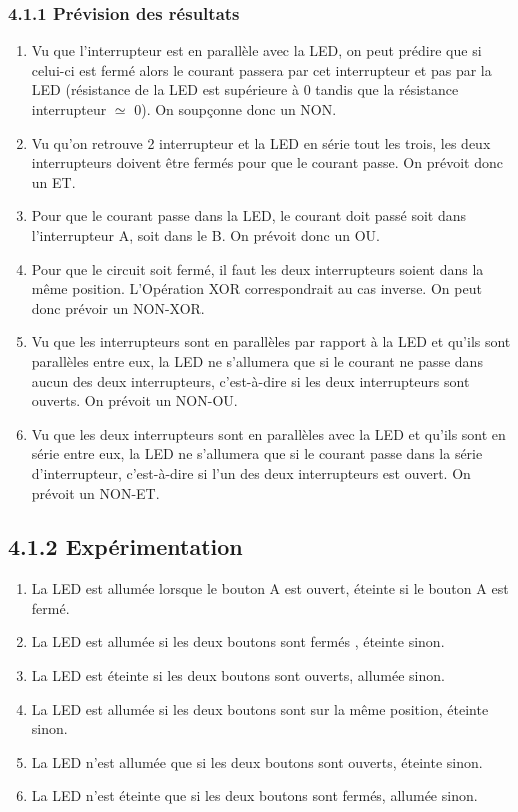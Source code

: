 \documentclass{report}
\begin{document}
\subsubsection*{4.1.1 Pr\'evision des r\'esultats}
\begin{enumerate}
\item Vu que l'interrupteur est en parall\`ele avec la LED, on peut pr\'edire que si celui-ci est ferm\'e alors le courant passera par cet interrupteur et pas par la LED (r\'esistance de la LED est sup\'erieure \`a 0 tandis que la r\'esistance interrupteur $\simeq$ 0). On soup\c conne donc un NON.
\item Vu qu'on retrouve 2 interrupteur et la LED en s\'erie tout les trois, les deux interrupteurs doivent \^etre ferm\'es pour que le courant passe. On pr\'evoit donc un ET.
\item Pour que le courant passe dans la LED, le courant doit pass\'e soit dans l'interrupteur A, soit dans le B. On pr\'evoit donc un OU.
\item Pour que le circuit soit ferm\'e, il faut les deux interrupteurs soient dans la m\^eme position. L'Op\'eration XOR correspondrait au cas inverse. On peut donc pr\'evoir un NON-XOR.
\item Vu que les interrupteurs sont en parall\`eles par rapport \`a la LED et qu'ils sont parall\`eles entre eux, la LED ne s'allumera que si le courant ne passe dans aucun des deux interrupteurs, c'est-\`a-dire si les deux interrupteurs sont ouverts. On pr\'evoit un NON-OU.
\item Vu que les deux interrupteurs sont en parallèles avec la LED et qu'ils sont en s\'erie entre eux, la LED ne s'allumera que si le courant passe dans la s\'erie d'interrupteur, c'est-\`a-dire si l'un des deux interrupteurs est ouvert. On pr\'evoit un NON-ET.
\end{enumerate}
\subsection*{4.1.2 Exp\'erimentation}
\begin{enumerate}
\item La LED est allum\'ee lorsque le bouton A est ouvert, \'eteinte si le bouton A est ferm\'e.
\item La LED est allum\'ee si les deux boutons sont ferm\'es , \'eteinte sinon.
\item La LED est \'eteinte si les deux boutons sont ouverts, allum\'ee sinon.
\item La LED est allum\'ee si les deux boutons sont sur la m\^eme position, \'eteinte sinon.
\item La LED n'est allum\'ee que si les deux boutons sont ouverts, \'eteinte sinon.
\item La LED n'est \'eteinte que si les deux boutons sont ferm\'es, allum\'ee sinon.

\end{enumerate}
\newpage
\end{document}
